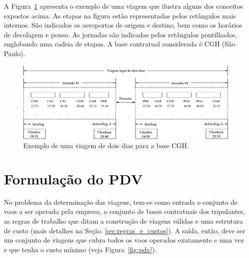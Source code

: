 A Figura~\ref{fig:viagem} apresenta o exemplo de uma viagem que ilustra alguns dos conceitos
expostos acima. As etapas na figura estão representadas pelos retângulos mais internos. São
indicados os aeroportos de origem e destino, bem como os horários de decolagem e pouso. As
jornadas são indicadas pelos retângulos pontilhados, englobando uma cadeia de etapas. A base 
contratual considerada é CGH (São Paulo). 

\begin{figure}[htbp]
	\begin{center}
		\includegraphics[scale=0.5]{fig/viagem.eps}
		\caption{Exemplo de uma viagem de dois dias para a base CGH.}
		\label{fig:viagem}
	\end{center}
\end{figure}


\section{Formulação do PDV}
\label{sec:formulacao}

No problema da determinação das viagens, tem-se como entrada o conjunto de voos a ser operado pela
empresa, o conjunto de bases contratuais dos tripulantes, as regras de trabalho que ditam a
construção de viagens válidas e uma estrutura de custo (mais detalhes na
Seção~\ref{sec:regras_e_custos}). A saída, então, deve ser um conjunto de viagens que cubra todos os
voos operados exatamente e uma vez e que tenha o custo mínimo (veja Figura~\ref{fig:pdv}).

